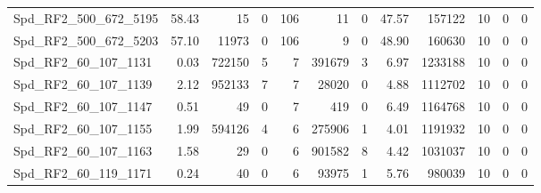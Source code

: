 \begin{longtable}[c]{@{}lrrrrrrrrrrr@{}}
Spd\_RF2\_500\_672\_5195      & 58.43                  & 15                      & 0                       & 106                    & 11                      & 0                       & 47.57                   & 157122                   & 10                       & 0                        & 0                        \\
Spd\_RF2\_500\_672\_5203      & 57.10                  & 11973                   & 0                       & 106                    & 9                       & 0                       & 48.90                   & 160630                   & 10                       & 0                        & 0                        \\
Spd\_RF2\_60\_107\_1131       & 0.03                   & 722150                  & 5                       & 7                      & 391679                  & 3                       & 6.97                    & 1233188                  & 10                       & 0                        & 0                        \\
Spd\_RF2\_60\_107\_1139       & 2.12                   & 952133                  & 7                       & 7                      & 28020                   & 0                       & 4.88                    & 1112702                  & 10                       & 0                        & 0                        \\
Spd\_RF2\_60\_107\_1147       & 0.51                   & 49                      & 0                       & 7                      & 419                     & 0                       & 6.49                    & 1164768                  & 10                       & 0                        & 0                        \\
Spd\_RF2\_60\_107\_1155       & 1.99                   & 594126                  & 4                       & 6                      & 275906                  & 1                       & 4.01                    & 1191932                  & 10                       & 0                        & 0                        \\
Spd\_RF2\_60\_107\_1163       & 1.58                   & 29                      & 0                       & 6                      & 901582                  & 8                       & 4.42                    & 1031037                  & 10                       & 0                        & 0                        \\
Spd\_RF2\_60\_119\_1171       & 0.24                   & 40                      & 0                       & 6                      & 93975                   & 1                       & 5.76                    & 980039                   & 10                       & 0                        & 0                        \\

\end{longtable}
